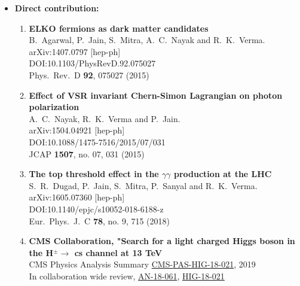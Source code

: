 \begin{itemize}[leftmargin=*]
\item {\textbf{Direct contribution:}
\begin{enumerate}[leftmargin=*]
\item%
{\bf {ELKO fermions as dark matter candidates}}
  \\{}B.~Agarwal, P.~Jain, S.~Mitra, A.~C.~Nayak and R.~K.~Verma.
  \\{}arXiv:1407.0797 [hep-ph]
  \\{}DOI:10.1103/PhysRevD.92.075027
  \\{}Phys.\ Rev.\ D {\bf 92}, 075027 (2015)

\item%
{\bf {Effect of VSR invariant Chern-Simon Lagrangian on photon polarization}}
  \\{}A.~C.~Nayak, R.~K.~Verma and P.~Jain.
  \\{}arXiv:1504.04921 [hep-ph]
  \\{}DOI:10.1088/1475-7516/2015/07/031
  \\{}JCAP {\bf 1507}, no. 07, 031 (2015)

\item%
{\bf {The top threshold effect in the $\gamma\gamma$ production at the LHC}}
  \\{}S.~R.~Dugad, P.~Jain, S.~Mitra, P.~Sanyal and R.~K.~Verma.
  \\{}arXiv:1605.07360 [hep-ph]
  \\{}DOI:10.1140/epjc/s10052-018-6188-z
  \\{}Eur.\ Phys.\ J.\ C {\bf 78}, no. 9, 715 (2018)

\item {\bf CMS Collaboration, "Search for a light charged Higgs boson
in the H$^{\pm}\rightarrow$ cs channel at 13 TeV}
  \\{}CMS Physics Analysis Summary \href{https://cds.cern.ch/record/2703049}{CMS-PAS-HIG-18-021}, 2019
  \\{} In collaboration wide review, \href{http://cms.cern.ch/iCMS/jsp/db_notes/noteInfo.jsp?cmsnoteid=CMS\%20AN-2018/061}{AN-18-061}, \href{http://cms.cern.ch/iCMS/analysisadmin/cadilines?line=HIG-18-021}{HIG-18-021}


\end{enumerate}}
\end{itemize}
